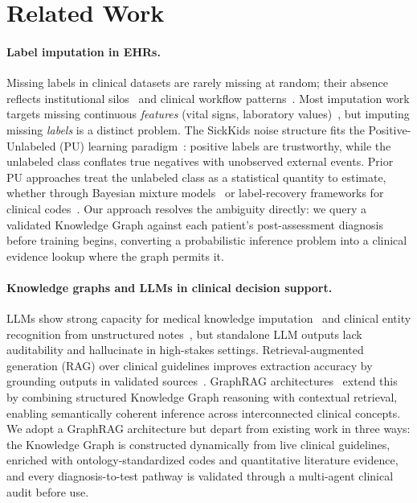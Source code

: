 \section{Related Work}

\paragraph{Label imputation in EHRs.}
Missing labels in clinical datasets are rarely missing at random; their absence reflects institutional silos~\cite{ross_accuracy_2020} and clinical workflow patterns~\cite{li_imputation_2021}. Most imputation work targets missing continuous \textit{features} (vital signs, laboratory values)~\cite{psychogyios_missing_2023}, but imputing missing \textit{labels} is a distinct problem. The SickKids noise structure fits the Positive-Unlabeled (PU) learning paradigm~\cite{bekker_learning_2020}: positive labels are trustworthy, while the unlabeled class conflates true negatives with unobserved external events. Prior PU approaches treat the unlabeled class as a statistical quantity to estimate, whether through Bayesian mixture models~\cite{wang_bayesian_2023} or label-recovery frameworks for clinical codes~\cite{kumar_detecting_2025}. Our approach resolves the ambiguity directly: we query a validated Knowledge Graph against each patient's post-assessment diagnosis before training begins, converting a probabilistic inference problem into a clinical evidence lookup where the graph permits it.

\paragraph{Knowledge graphs and LLMs in clinical decision support.}
LLMs show strong capacity for medical knowledge imputation~\cite{yao_llm_imputation_2025} and clinical entity recognition from unstructured notes~\cite{islam_llm-based_2025}, but standalone LLM outputs lack auditability and hallucinate in high-stakes settings. Retrieval-augmented generation (RAG) over clinical guidelines improves extraction accuracy by grounding outputs in validated sources~\cite{li_automated_2024, nanua_retrieval-augmented_2025}. GraphRAG architectures~\cite{edge_local_2024, peng_graphrag_survey_2024} extend this by combining structured Knowledge Graph reasoning with contextual retrieval, enabling semantically coherent inference across interconnected clinical concepts. We adopt a GraphRAG architecture but depart from existing work in three ways: the Knowledge Graph is constructed dynamically from live clinical guidelines, enriched with ontology-standardized codes and quantitative literature evidence, and every diagnosis-to-test pathway is validated through a multi-agent clinical audit before use.

